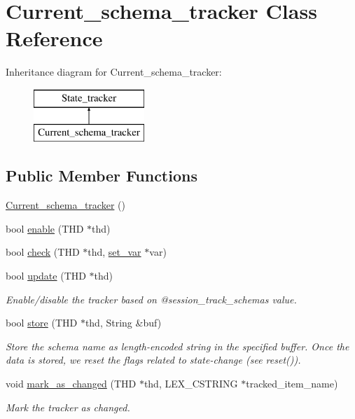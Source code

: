 \hypertarget{classCurrent__schema__tracker}{}\section{Current\+\_\+schema\+\_\+tracker Class Reference}
\label{classCurrent__schema__tracker}
Inheritance diagram for Current\+\_\+schema\+\_\+tracker\+:\begin{figure}[H]
\begin{center}
\leavevmode
\includegraphics[height=2.000000cm]{classCurrent__schema__tracker}
\end{center}
\end{figure}
\subsection*{Public Member Functions}
\begin{DoxyCompactItemize}
\item 
\mbox{\hyperlink{classCurrent__schema__tracker_a95e11e8c1510e1a9845d74f8dc99664f}{Current\+\_\+schema\+\_\+tracker}} ()
\item 
bool \mbox{\hyperlink{classCurrent__schema__tracker_a7d1b177b9d6cd378e072aea79c07252c}{enable}} (T\+HD $\ast$thd)
\item 
bool \mbox{\hyperlink{classCurrent__schema__tracker_adb85ededcff63655f491046f93a82cba}{check}} (T\+HD $\ast$thd, \mbox{\hyperlink{classset__var}{set\+\_\+var}} $\ast$var)
\item 
bool \mbox{\hyperlink{classCurrent__schema__tracker_a087a504d0c2ff939acecf08c891d3725}{update}} (T\+HD $\ast$thd)
\begin{DoxyCompactList}\small\item\em Enable/disable the tracker based on @session\+\_\+track\+\_\+schema\textquotesingle{}s value. \end{DoxyCompactList}\item 
bool \mbox{\hyperlink{classCurrent__schema__tracker_a9d33638a5c4db24bb480f9aa0e202edb}{store}} (T\+HD $\ast$thd, String \&buf)
\begin{DoxyCompactList}\small\item\em Store the schema name as length-\/encoded string in the specified buffer. Once the data is stored, we reset the flags related to state-\/change (see reset()). \end{DoxyCompactList}\item 
void \mbox{\hyperlink{classCurrent__schema__tracker_a5b7b338910bed0627c6312b9de307dde}{mark\+\_\+as\+\_\+changed}} (T\+HD $\ast$thd, L\+E\+X\+\_\+\+C\+S\+T\+R\+I\+NG $\ast$tracked\+\_\+item\+\_\+name)
\begin{DoxyCompactList}\small\item\em Mark the tracker as changed. \end{DoxyCompactList}\end{DoxyCompactItemize}
